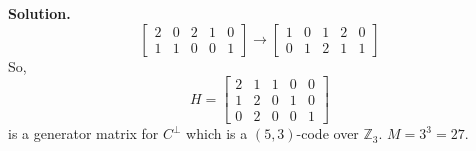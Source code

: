 \begin{exbox}
\begin{example}
        \textbf{Solution.}
        \[\begin{bmatrix}
                2 & 0 & 2 & 1 & 0 \\
                1 & 1 & 0 & 0 & 1
            \end{bmatrix}\rightarrow
            \begin{bmatrix}
                1 & 0 & 1 & 2 & 0 \\
                0 & 1 & 2 & 1 & 1
            \end{bmatrix}\]
        So,
        \[ H=
            \left[\begin{array}{cc|ccc}
                    2 & 1 & 1 & 0 & 0 \\
                    1 & 2 & 0 & 1 & 0 \\
                    0 & 2 & 0 & 0 & 1
                \end{array}\right] \]
        is a generator matrix for $ C^{\perp} $ which is a $ (5,3) $-code
        over $ \mathbb{Z}_3 $. $ M=3^3=27 $.
    \end{example}
\end{exbox}
